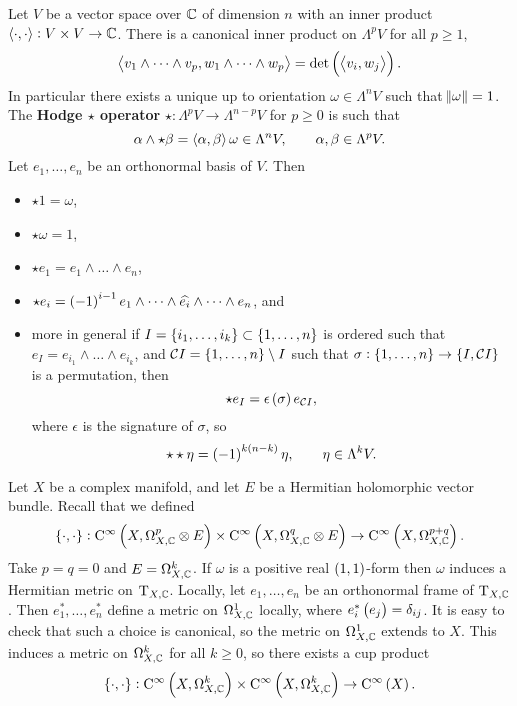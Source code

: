 Let $ V $ be a vector space over $ \mathbb{C} $ of dimension $ n $ with an inner product $ \left\langle \cdot, \cdot \right\rangle : V \times V \to \mathbb{C} $. There is a canonical inner product on $ \Lambda^pV $ for all $ p \ge 1 $,
$$ \abr{v_1 \wedge \dots \wedge v_p, w_1 \wedge \dots \wedge w_p} = \det \br{\abr{v_i, w_j}}. $$
In particular there exists a unique up to orientation $ \omega \in \Lambda^nV $ such that $ \norm{\omega} = 1 $. The \textbf{Hodge $ \star $ operator} $ \star : \Lambda^pV \to \Lambda^{n - p}V $ for $ p \ge 0 $ is such that
$$ \alpha \wedge \star\beta = \left\langle \alpha, \beta \right\rangle\omega \in \Lambda^nV, \qquad \alpha, \beta \in \Lambda^pV. $$
Let $ e_1, \dots, e_n $ be an orthonormal basis of $ V $. Then
\begin{itemize}
\item $ \star 1 = \omega $,
\item $ \star\omega = 1 $,
\item $ \star e_1 = e_1 \wedge \dots \wedge e_n $,
\item $ \star e_i = \br{-1}^{i - 1}e_1 \wedge \dots \wedge \widehat{e_i} \wedge \dots \wedge e_n $, and
\item more in general if $ I = \cbr{i_1, \dots, i_k} \subset \cbr{1, \dots, n} $ is ordered such that $ e_I = e_{i_1} \wedge \dots \wedge e_{i_k} $, and $ \CCC I = \cbr{1, \dots, n} \setminus I $ such that $ \sigma : \cbr{1, \dots, n} \to \cbr{I, \CCC I} $ is a permutation, then
$$ \star e_I = \epsilon\br{\sigma}e_{\CCC I}, $$
where $ \epsilon $ is the signature of $ \sigma $, so
$$ \star\star\eta = \br{-1}^{k\br{n - k}}\eta, \qquad \eta \in \Lambda^kV. $$
\end{itemize}
Let $ X $ be a complex manifold, and let $ E $ be a Hermitian holomorphic vector bundle. Recall that we defined
$$ \cbr{\cdot, \cdot} : \C^\infty\br{X, \Omega_{X, \CC}^p \otimes E} \times \C^\infty\br{X, \Omega_{X, \CC}^q \otimes E} \to \C^\infty\br{X, \Omega_{X, \CC}^{p + q}}. $$
Take $ p = q = 0 $ and $ E = \Omega_{X, \mathbb{C}}^k $. If $ \omega $ is a positive real $ \br{1, 1} $-form then $ \omega $ induces a Hermitian metric on $ \mathrm{T}_{X, \mathbb{C}} $. Locally, let $ e_1, \dots, e_n $ be an orthonormal frame of $ \mathrm{T}_{X, \mathbb{C}} $. Then $ e_1^*, \dots, e_n^* $ define a metric on $ \Omega_{X, \mathbb{C}}^1 $ locally, where $ e_i^*\br{e_j} = \delta_{ij} $. It is easy to check that such a choice is canonical, so the metric on $ \Omega_{X, \mathbb{C}}^1 $ extends to $ X $. This induces a metric on $ \Omega_{X, \mathbb{C}}^k $ for all $ k \ge 0 $, so there exists a cup product
$$ \cbr{\cdot, \cdot} : \C^\infty\br{X, \Omega_{X, \CC}^k} \times \C^\infty\br{X, \Omega_{X, \CC}^k} \to \C^\infty\br{X}. $$

